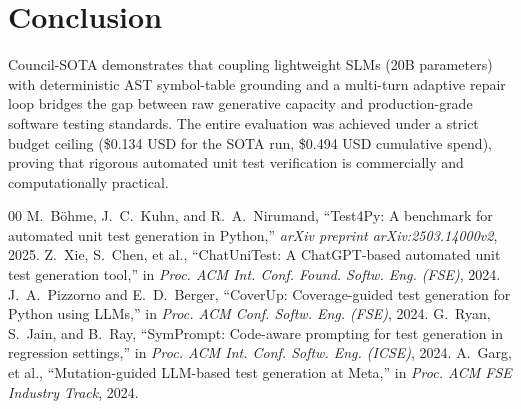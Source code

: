 \documentclass[conference]{IEEEtran}
\begin{document}
\section{Conclusion}
Council-SOTA demonstrates that coupling lightweight SLMs (20B parameters) with deterministic AST symbol-table grounding and a multi-turn adaptive repair loop bridges the gap between raw generative capacity and production-grade software testing standards. The entire evaluation was achieved under a strict budget ceiling (\$0.134 USD for the SOTA run, \$0.494 USD cumulative spend), proving that rigorous automated unit test verification is commercially and computationally practical.

\begin{thebibliography}{00}
M.~Böhme, J.~C.~Kuhn, and R.~A.~Nirumand, ``Test4Py: A benchmark for automated unit test generation in Python,'' \emph{arXiv preprint arXiv:2503.14000v2}, 2025.
Z.~Xie, S.~Chen, et al., ``ChatUniTest: A ChatGPT-based automated unit test generation tool,'' in \emph{Proc. ACM Int. Conf. Found. Softw. Eng. (FSE)}, 2024.
J.~A.~Pizzorno and E.~D.~Berger, ``CoverUp: Coverage-guided test generation for Python using LLMs,'' in \emph{Proc. ACM Conf. Softw. Eng. (FSE)}, 2024.
G.~Ryan, S.~Jain, and B.~Ray, ``SymPrompt: Code-aware prompting for test generation in regression settings,'' in \emph{Proc. ACM Int. Conf. Softw. Eng. (ICSE)}, 2024.
A.~Garg, et al., ``Mutation-guided LLM-based test generation at Meta,'' in \emph{Proc. ACM FSE Industry Track}, 2024.
\end{thebibliography}
\end{document}
